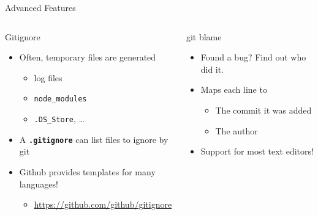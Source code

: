\documentclass[compress,aspectratio=169]{beamer}
\begin{document}
  \begin{frame}{Advanced Features}
    \begin{columns}
      \begin{column}{0.5\textwidth}
        \begin{block}{Gitignore}
          \begin{itemize}
            \item Often, temporary files are generated
              \begin{itemize}
                \item log files
                \item \texttt{node\_modules}
                \item \texttt{.DS\_Store}, \dots
              \end{itemize}
            \item A \textbf{\texttt{.gitignore}} can list files to ignore by git
            \item Github provides templates for many languages!
              \begin{itemize}
                \item \href{https://github.com/github/gitignore}{\url{https://github.com/github/gitignore}}
              \end{itemize}
          \end{itemize}
        \end{block}
      \end{column}
      \begin{column}{0.5\textwidth}
        \begin{block}{git blame}
          \begin{itemize}
            \item Found a bug? Find out who did it.
            \item Maps each line to
              \begin{itemize}
                \item The commit it was added
                \item The author
              \end{itemize}
            \item Support for most text editors!
          \end{itemize}
        \end{block}
      \end{column}
    \end{columns}
  \end{frame}
\end{document}
